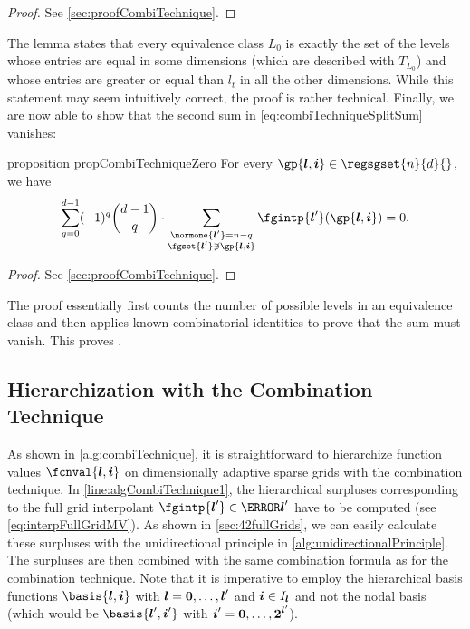 \begin{proof}
  See \cref{sec:proofCombiTechnique}.
\end{proof}

The lemma states that every equivalence class $L_0$ is exactly the
set of the levels whose entries are equal in some dimensions
(which are described with $T_{L_0}$)
and whose entries are greater or equal than $l_t$ in all the other dimensions.
While this statement may seem intuitively correct,
the proof is rather technical.
Finally, we are now able to show that the second sum in
\eqref{eq:combiTechniqueSplitSum} vanishes:

\begin{restatable}{%
  proposition%
}{%
  propCombiTechniqueZero%
}
  \label{prop:combiTechniqueZero}
  For every $\gp{\*l,\*i} \in \regsgset{n}{d}{}$, we have
  \begin{equation}
    \sum_{q=0}^{d-1} (-1)^q \binom{d-1}{q} \cdot
    \sum_{\substack{\normone{\*l'} = n - q\\\fgset{\*l'} \notni \gp{\*l,\*i}}}
    \fgintp{\*l'}(\gp{\*l,\*i})
    = 0.
  \end{equation}
\end{restatable}

\begin{proof}
  See \cref{sec:proofCombiTechnique}.
\end{proof}

The proof essentially first counts the number of possible levels in
an equivalence class and then applies known combinatorial identities
to prove that the sum must vanish.
This proves .



\subsection{Hierarchization with the Combination Technique}
\label{sec:432hierarchizationCombiTechnique}

As shown in \cref{alg:combiTechnique},
it is straightforward to hierarchize function values
$\fcnval{\*l,\*i}$ on dimensionally adaptive sparse grids
with the combination technique.
In \cref{line:algCombiTechnique1},
the hierarchical surpluses corresponding to the full grid
interpolant $\fgintp{\*l'} \in \ns{\*l'}$ have to be computed
(see \eqref{eq:interpFullGridMV}).
As shown in \cref{sec:42fullGrids}, we can easily calculate these
surpluses with the unidirectional principle in
\cref{alg:unidirectionalPrinciple}.
The surpluses are then combined with the same combination formula
as for the combination technique.
Note that it is imperative to employ the hierarchical basis functions
$\basis{\*l,\*i}$ with ${\boldsymbol{l}} = {\boldsymbol{0}}, \dotsc, {\boldsymbol{l}}'$ and ${\boldsymbol{i}} \in I_{{\boldsymbol{l}}}$
and not the nodal basis
(which would be $\basis{\*l',\*i'}$ with ${\boldsymbol{i}}' = {\boldsymbol{0}}, \dotsc, {\boldsymbol{2}}^{{\boldsymbol{l}}'}$).


